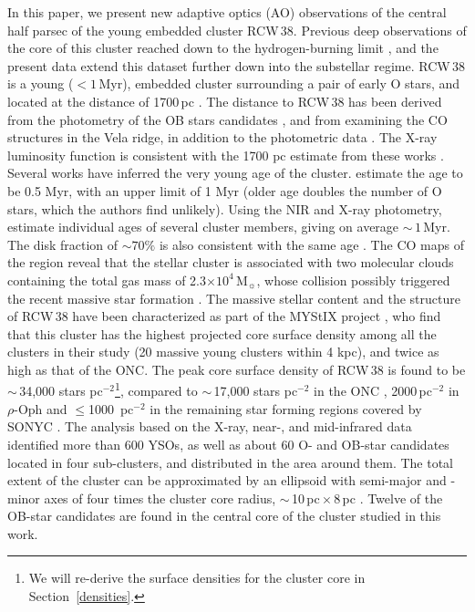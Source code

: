 \documentclass[a4paper,fleqn,usenatbib]{mnras}
\begin{document}
In this paper, we present new adaptive optics (AO) observations of the central half parsec of the young embedded cluster RCW\,38.
Previous deep observations of the core of this cluster reached down to the hydrogen-burning limit \citep{derose09}, 
and the present data extend this dataset further down into the substellar regime.
RCW\,38 is a young ($<1$\,Myr), embedded cluster surrounding a pair of early O stars, and located
at the distance of 1700\,pc \citep{wolk08}. 
The distance to RCW\,38 has been derived from the photometry of the OB stars candidates \citep{muzzio79, avedisova89}, and
from examining the CO structures in the Vela ridge, in addition to the photometric data \citep{murphy85}. The X-ray luminosity 
function is consistent with the 1700 pc estimate from these works \citep{wolk06}. 
Several works have inferred the very young age of the cluster. \citep{wolk06} estimate the age to be 0.5 Myr, with an upper limit
of 1 Myr (older age doubles the number of O stars, which the authors find unlikely). Using the NIR and X-ray photometry, \citet{getman14}
estimate individual ages of several cluster members, giving on average $\sim\,1$\,Myr. The disk fraction of $\sim 70 \%$ is also consistent
with the same age \citep{winston11}.
The CO maps of the region reveal that the stellar cluster is associated with two molecular clouds containing the total gas mass of 2.3$\times10^4$\,M$_{\sun}$, whose collision possibly
triggered the recent massive star formation \citep{fukui16}.
The massive stellar content and the structure of RCW\,38 have been characterized 
as part of the MYStIX project \citep{kuhn15}, who find that this cluster has the highest projected core surface 
density among all the clusters in their study (20 massive young clusters within 4 kpc),
 and twice as high as that of the ONC. The peak core surface density of RCW\,38 is found to be $\sim\,$34,000 stars pc$^{-2}$\footnote{We will re-derive the surface densities for the cluster core in Section~\ref{densities}.}, compared to 
 $\sim\,$17,000 stars pc$^{-2}$ in the ONC \citep{kuhn15}, 2000\,pc$^{-2}$ in $\rho$-Oph and $\leq$1000 \,pc$^{-2}$ in the remaining star forming regions 
 covered by SONYC \citep{gutermuth09}. The analysis based on the 
X-ray, near-, and mid-infrared data \citep{wolk06, winston11} identified more than 600 YSOs, as well as about 60 O- and OB-star candidates located
in four sub-clusters, and distributed in the area around them. The total extent of the cluster can be approximated by an ellipsoid
with semi-major and -minor axes of four times the cluster core radius, $\sim\,$10\,pc\,$\times$\,8\,pc \citep{kuhn14}. Twelve of the OB-star candidates are found in the central
core of the cluster studied in this work.
\end{document}
